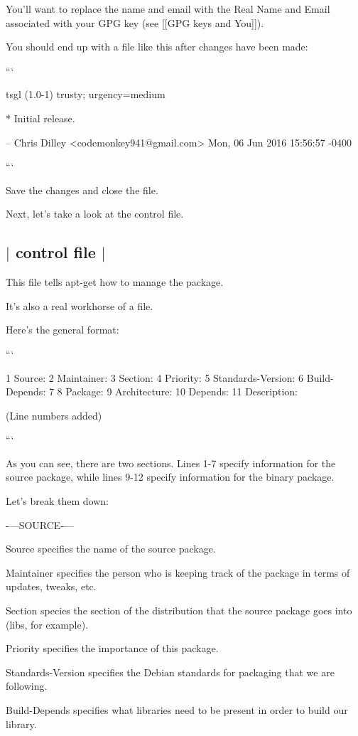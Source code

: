 You'll want to replace the name and email with the Real Name and Email associated with your G\-P\-G key (see \mbox{[}\mbox{[}G\-P\-G keys and You\mbox{]}\mbox{]}).

You should end up with a file like this after changes have been made\-:

``` \begin{DoxyVerb}tsgl (1.0-1) trusty; urgency=medium

  * Initial release.

 -- Chris Dilley <codemonkey941@gmail.com>  Mon, 06 Jun 2016 15:56:57 -0400
\end{DoxyVerb}


```

Save the changes and close the file.

Next, let's take a look at the {\ttfamily control} file. 

 \subsection*{$\vert$ {\ttfamily control} file $\vert$ }

This file tells {\ttfamily apt-\/get} how to manage the package.

It's also a real workhorse of a file.

Here's the general format\-:

``` \begin{DoxyVerb}1 Source:
2 Maintainer:
3 Section:
4 Priority:
5 Standards-Version:
6 Build-Depends: 
7
8 Package:
9 Architecture:
10 Depends:
11 Description:
\end{DoxyVerb}


(Line numbers added)

```

As you can see, there are two sections. Lines 1-\/7 specify information for the source package, while lines 9-\/12 specify information for the binary package.

Let's break them down\-:

-\/---S\-O\-U\-R\-C\-E-\/---


\begin{DoxyItemize}
\item {\ttfamily Source} specifies the name of the source package.
\item {\ttfamily Maintainer} specifies the person who is keeping track of the package in terms of updates, tweaks, etc.
\item {\ttfamily Section} species the section of the distribution that the source package goes into (libs, for example).
\item {\ttfamily Priority} specifies the importance of this package.
\item {\ttfamily Standards-\/\-Version} specifies the Debian standards for packaging that we are following.
\item {\ttfamily Build-\/\-Depends} specifies what libraries need to be present in order to build our library.
\end{DoxyItemize}

